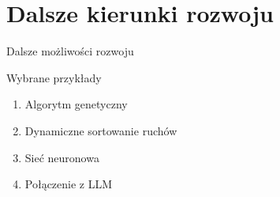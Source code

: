 \section{Dalsze kierunki rozwoju}\label{sec:dalsze-kierunki-rozwoju}

\begin{frame}{Dalsze możliwości rozwoju}

    \begin{block}{Wybrane przykłady}
        \begin{enumerate}
            \item Algorytm genetyczny
            \item Dynamiczne sortowanie ruchów
            \item Sieć neuronowa
            \item Połączenie z LLM
        \end{enumerate}
    \end{block}

    \begin{alertblock}
    \end{alertblock}
\end{frame}